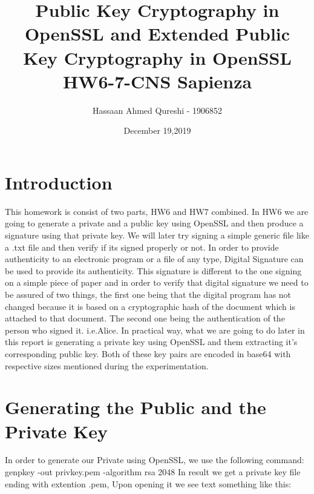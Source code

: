 \documentclass[11pt]{article}
\begin{document}
\title{%
	Public Key Cryptography in OpenSSL and Extended Public Key Cryptography in OpenSSL\\
	\large HW6-7-CNS Sapienza}

\author{Hassaan Ahmed Qureshi - 1906852}
\date{December 19,2019}
\maketitle{}
\newpage
\tableofcontents

\newpage

\section{Introduction}
This homework is consist of two parts, HW6 and HW7 combined. In HW6 we are going to generate a private and a public key using OpenSSL and then produce a signature using that private key. We will later try signing a simple generic file like a .txt file and then verify if its signed properly or not. \newline \newline In order to provide authenticity to an electronic program or a file of any type, Digital Signature can be used to provide its authenticity. This signature is different to the one signing on a simple piece of paper and in order to verify that digital signature we need to be assured of two things, the first one being that the digital program has not changed because it is based on a cryptographic hash of the document which is attached to that document. The second one being the authentication of the person who signed it. i.e.Alice.  \newline \newline In practical way, what we are going to do later in this report is generating a private key using OpenSSL and them extracting it's corresponding public key. Both of these key pairs are encoded in base64 with respective sizes mentioned during the experimentation.

\section{Generating the Public and the Private Key}
In order to generate our Private using OpenSSL, we use the following command: \newline \newline  genpkey -out privkey.pem -algorithm rsa 2048 \newline \newline In result we get a private key file ending with extention .pem, Upon opening it we see text something like this:
\end{document}
